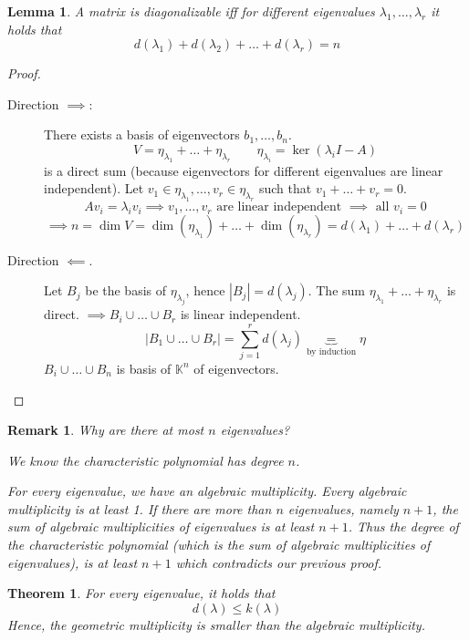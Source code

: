 \documentclass[a4paper]{article}
\newcounter{lecref}[section]
\numberwithin{lecref}{section}
\newtheorem{theorem}[lecref]{Theorem}
\newtheorem{lemma}[lecref]{Lemma}
\newtheorem*{Remark}{Remark}
\newcommand{\card}[1]{\left|#1\right|}
\begin{document}
\begin{lemma} %
  A matrix is diagonalizable iff for different eigenvalues $\lambda_1, \dots, \lambda_r$ it holds that
  \[ d(\lambda_1) + d(\lambda_2) + \dots + d(\lambda_r) = n \]
\end{lemma}

\begin{proof} \hfill{}
  \begin{description}
    \item[Direction $\implies$:]
      There exists a basis of eigenvectors $b_1, \dots, b_n$.
      \[ V = \eta_{\lambda_1} + \dots + \eta_{\lambda_r} \qquad \eta_{\lambda_i} = \ker(\lambda_i I - A) \]
      is a direct sum (because eigenvectors for different eigenvalues are linear independent).
      Let $v_1 \in \eta_{\lambda_1}, \dots, v_r \in \eta_{\lambda_r}$ such that $v_1 + \dots + v_r = 0$.
      \[ A v_i = \lambda_i v_i \implies v_1, \dots, v_r \text{ are linear independent } \implies \text{ all } v_i = 0 \]
      \[ \implies n = \dim{V} = \dim(\eta_{\lambda_1}) + \dots + \dim(\eta_{\lambda_r}) = d(\lambda_1) + \dots + d(\lambda_r) \]
    \item[Direction $\impliedby$.]
      Let $B_j$ be the basis of $\eta_{\lambda_j}$, hence $\card{B_j} = d(\lambda_j)$.
      The sum $\eta_{\lambda_1} + \dots + \eta_{\lambda_r}$ is direct.
      $\implies B_i \cup \dots \cup B_r$ is linear independent.
      \[ \card{B_1 \cup \dots \cup B_r} = \sum_{j=1}^r d(\lambda_j) \underbrace{=}_{\text{by induction}} \eta \]
      $B_i \cup \dots \cup B_n$ is basis of $\mathbb K^n$ of eigenvectors.
  \end{description}
\end{proof}

\begin{Remark}
  Why are there at most $n$ eigenvalues?

  We know the characteristic polynomial has degree $n$.

  For every eigenvalue, we have an algebraic multiplicity. Every algebraic multiplicity is at least 1.
  If there are more than $n$ eigenvalues, namely $n+1$, the sum of algebraic multiplicities of eigenvalues is at least $n+1$.
  Thus the degree of the characteristic polynomial (which is the sum of algebraic multiplicities of eigenvalues), is at least $n+1$ which contradicts our previous proof.
\end{Remark}

\begin{theorem} %
  For every eigenvalue, it holds that
  \[ d(\lambda) \leq k(\lambda) \]
  Hence, the geometric multiplicity is smaller than the algebraic multiplicity.
\end{theorem}
\end{document}
